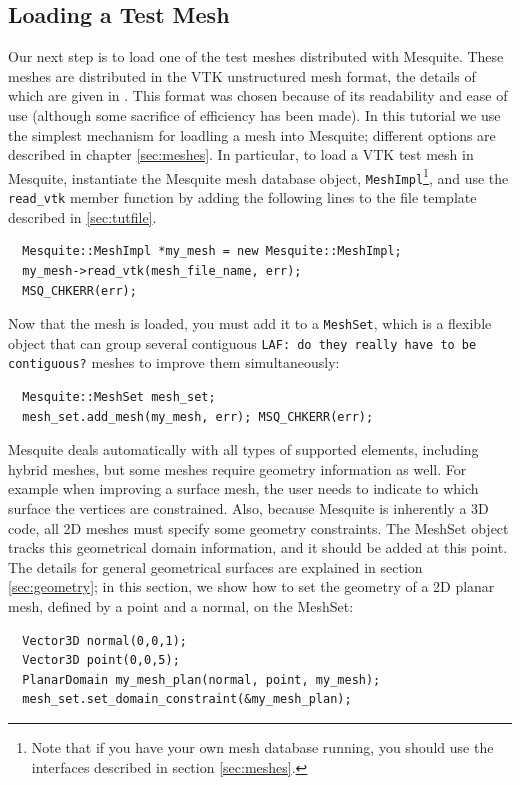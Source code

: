 \documentclass[letter]{report}
\begin{document}
\subsection{Loading a Test Mesh}
\label{sec:tutMesh}
Our next step is to load one of the test meshes distributed with
Mesquite.  These meshes are distributed in the VTK unstructured mesh
format, the details of which are given in \cite{VTKbook, VTKuml}. This
format was chosen because of its readability and ease of use (although
some sacrifice of efficiency has been made).  In this tutorial we use
the simplest mechanism for loadling a mesh into Mesquite; different
options are described in chapter \ref{sec:meshes}.  In particular, to
load a VTK test mesh in Mesquite, instantiate the Mesquite mesh
database object,
\texttt{MeshImpl}\footnote{Note that if you have your own mesh
database running, you should use the interfaces described in section
\ref{sec:meshes}.}, and use the \texttt{read\_vtk} member function by
adding the following lines to the file template described in
\ref{sec:tutfile}.
\begin{verbatim}
  Mesquite::MeshImpl *my_mesh = new Mesquite::MeshImpl;
  my_mesh->read_vtk(mesh_file_name, err); 
  MSQ_CHKERR(err);
\end{verbatim}
Now that the mesh is loaded, you must add it to a {\tt MeshSet}, which
is a flexible object that can group several contiguous {\tt LAF: do
they really have to be contiguous?} meshes to improve them simultaneously:
\begin{verbatim}
  Mesquite::MeshSet mesh_set;
  mesh_set.add_mesh(my_mesh, err); MSQ_CHKERR(err);
\end{verbatim}
Mesquite deals automatically with all types of supported elements,
including hybrid meshes, but some meshes require geometry information
as well.  For example when improving a surface mesh, the user needs to
indicate to which surface the vertices are constrained.  Also, because
Mesquite is inherently a 3D code, all 2D meshes must specify some
geometry constraints.  The MeshSet object tracks this geometrical
domain information, and it should be added at this point.  The details
for general geometrical surfaces are explained in section
\ref{sec:geometry}; in this section,
we show how to set the geometry of a 2D planar mesh, defined by a
point and a normal, on the MeshSet:
\begin{verbatim}
  Vector3D normal(0,0,1);
  Vector3D point(0,0,5);
  PlanarDomain my_mesh_plan(normal, point, my_mesh);
  mesh_set.set_domain_constraint(&my_mesh_plan);
\end{verbatim}
\end{document}
